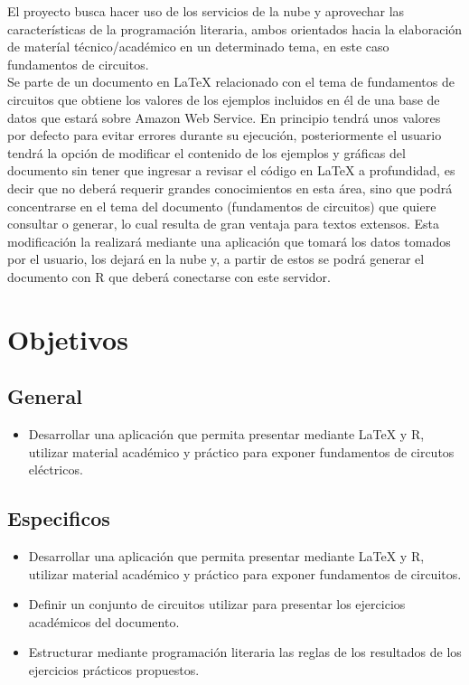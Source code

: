 \documentclass[10pt]{article}\usepackage[]{graphicx}\usepackage[]{color}
\begin{document}
El proyecto busca hacer uso de los servicios de la nube y aprovechar las características de la programación literaria, ambos orientados hacia la elaboración de materíal técnico/académico en un determinado tema, en este caso fundamentos de circuitos. \\
Se parte de un documento en LaTeX relacionado con el tema de fundamentos de circuitos que obtiene los valores de los ejemplos incluidos en él de una base de datos que estará sobre Amazon Web Service. En principio tendrá unos valores por defecto para evitar errores durante su ejecución, posteriormente el usuario tendrá la opción de modificar el contenido de los ejemplos y gráficas del documento sin tener que ingresar a revisar el código en LaTeX a profundidad, es decir que no deberá requerir grandes conocimientos en esta área, sino que podrá concentrarse en el tema del documento (fundamentos de circuitos) que quiere consultar o generar, lo cual resulta de gran ventaja para textos extensos. Esta modificación la realizará mediante una aplicación que tomará los datos tomados por el usuario, los dejará en la nube y, a partir de estos se podrá generar el documento con R que deberá conectarse con este servidor.\\

\section{Objetivos}

\subsection{General}

	\begin{itemize}
		\item Desarrollar una aplicación que permita presentar mediante LaTeX y R, utilizar material académico y práctico para exponer fundamentos de circutos eléctricos.
	\end{itemize}
	
\subsection{Especificos}

\begin{itemize}
\item Desarrollar una aplicación  que permita presentar mediante LaTeX y R, utilizar material académico y práctico para exponer fundamentos de circuitos.
\end{itemize}
\begin{itemize}
\item Definir un conjunto de circuitos utilizar para presentar los ejercicios académicos del documento.
\end{itemize}
\begin{itemize}
\item Estructurar mediante programación literaria las reglas de los resultados de los ejercicios prácticos propuestos.
\end{itemize}
	
\end{document}

